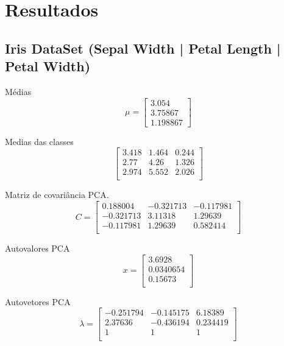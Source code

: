 \documentclass[a4paper, 11pt]{article}
\begin{document}
\section*{Resultados}
\subsection*{Iris DataSet (Sepal Width | Petal Length | Petal Width)}

Médias
$$ \mu =
\begin{bmatrix}
3.054 \\
3.75867 \\
1.198867
\end{bmatrix}
$$

Medias das classes
$$
\begin{bmatrix}
3.418&1.464&0.244\\
2.77&4.26&1.326\\
2.974&5.552&2.026\\
\end{bmatrix}
$$

Matriz de covariância PCA.
$$ C =
\begin{bmatrix}
0.188004&-0.321713&-0.117981\\
-0.321713&3.11318&1.29639\\
-0.117981&1.29639&0.582414\\
\end{bmatrix}
$$

Autovalores PCA
$$ x =
\begin{bmatrix}
3.6928\\
0.0340654\\
0.15673\\
\end{bmatrix}
$$

Autovetores PCA
$$ \lambda =
\begin{bmatrix}
-0.251794&-0.145175&6.18389\\
2.37636&-0.436194&0.234419\\
1&1&1\\
\end{bmatrix}
$$
\end{document}
